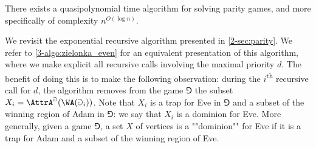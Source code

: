 \begin{theorem}
\label{3-thm:quasipolynomial_mcnaughton_zielonka_algorithm}
There exists a quasipolynomial time algorithm for solving parity games, and more specifically of complexity $n^{O(\log n)}$.
\end{theorem}


We revisit the exponential recursive algorithm presented in \cref{2-sec:parity}.
We refer to \cref{3-algo:zielonka_even} for an equivalent presentation of this algorithm, 
where we make explicit all recursive calls involving the maximal priority $d$.
The benefit of doing this is to make the following observation:
during the $i$\textsuperscript{th} recursive call for $d$, the algorithm removes from the game $\Game$ the subset 
$X_i = \AttrA^{\Game}( \WA(\Game_i) )$. 
Note that $X_i$ is a trap for Eve in $\Game$ and a subset of the winning region of Adam in $\Game$:
we say that $X_i$ is a dominion for Eve.
More generally, given a game $\Game$, a set $X$ of vertices is a ""dominion"" for Eve if
it is a trap for Adam and a subset of the winning region of Eve.

